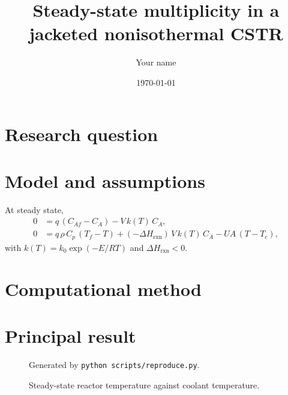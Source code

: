 \documentclass[11pt]{article}
\title{Steady-state multiplicity in a jacketed nonisothermal CSTR}
\author{Your name}
\date{\today}
\newcommand{\artifact}[1]{\textsuperscript{[\texttt{#1}]}}
\newcommand{\generatedby}[1]{\par\smallskip\footnotesize Generated by
  \texttt{#1}.\normalsize}
\begin{document}
\maketitle

\section{Research question}

\section{Model and assumptions}
%

At steady state,
\begin{align}
  0 &= q\,(C_{Af} - C_A) - V\,k(T)\,C_A, \\
  0 &= q\,\rho\,C_p\,(T_f - T) + (-\Delta H_{\mathrm{rxn}})\,V\,k(T)\,C_A
       - UA\,(T - T_c),
\end{align}
with $k(T) = k_0 \exp(-E/RT)$ and $\Delta H_{\mathrm{rxn}} < 0$.

\section{Computational method}

\section{Principal result}

\begin{figure}[htbp]
  \centering
  \caption{Steady-state reactor temperature against coolant temperature.}
  \label{fig:locus}
  \generatedby{python scripts/reproduce.py}
\end{figure}
\end{document}
